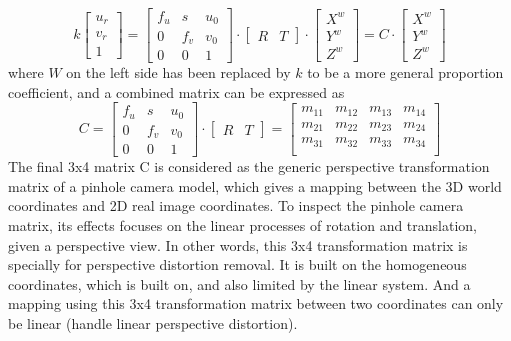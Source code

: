 \begin{equation}
%
k \left[ \begin{array}{c} u_r \\ v_r \\ 1 \end{array} \right] %
=  \begin{bmatrix} f_u & s & u_0 \\ 0 & f_v & v_0 \\ 0 & 0 & 1 \end{bmatrix} \cdot%
\begin{bmatrix} R & T \end{bmatrix} \cdot \left[ \begin{array}{c} X^w \\ Y^w \\ Z^w \end{array} \right]%
=  C \cdot \left[ \begin{array}{c} X^w \\ Y^w \\ Z^w \end{array} \right]%
%
\label{detailedPerspectivePinholeCameraMatrix}
\end{equation}%
%
where \(W\) on the left side has been replaced by \(k\) to be a more general proportion coefficient, and a combined matrix can be expressed as
\begin{equation}
%
C %
=  \begin{bmatrix} f_u & s & u_0 \\ 0 & f_v & v_0 \\ 0 & 0 & 1 \end{bmatrix} \cdot%
\begin{bmatrix} R & T \end{bmatrix}%
= \begin{bmatrix} 
m_{11} & m_{12} & m_{13} & m_{14} \\
m_{21} & m_{22} & m_{23} & m_{24} \\
m_{31} & m_{32} & m_{33} & m_{34} \\
\end{bmatrix}%
%
\label{genericPerspectivePinholeMatrix}
\end{equation}%
%
The final 3x4 matrix C is considered as the generic perspective transformation matrix of a pinhole camera model, which gives a mapping between the 3D world coordinates and 2D real image coordinates. To inspect the pinhole camera matrix, its effects focuses on the linear processes of rotation and translation, given a perspective view. In other words, this 3x4 transformation matrix is specially for perspective distortion removal. It is built on the homogeneous coordinates, which is built on, and also limited by the linear system. And a mapping using this 3x4 transformation matrix between two coordinates can only be linear (handle linear perspective distortion).\par


